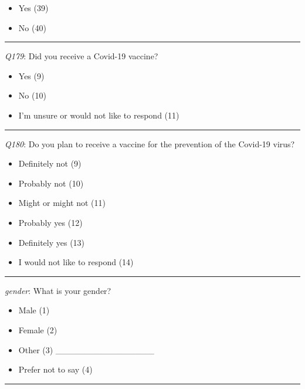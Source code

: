 \begin{singlespace}
\begin{itemize}
\tightlist
\item
  Yes (39)
\item
  No (40)
\end{itemize}

\begin{center}\rule{0.5\linewidth}{0.5pt}\end{center}

\emph{Q179}: Did you receive a Covid-19 vaccine?

\begin{itemize}
\tightlist
\item
  Yes (9)
\item
  No (10)
\item
  I'm unsure or would not like to respond (11)
\end{itemize}

\begin{center}\rule{0.5\linewidth}{0.5pt}\end{center}

\emph{Q180}: Do you plan to receive a vaccine for the prevention of the Covid-19 virus?

\begin{itemize}
\tightlist
\item
  Definitely not (9)
\item
  Probably not (10)
\item
  Might or might not (11)
\item
  Probably yes (12)
\item
  Definitely yes (13)
\item
  I would not like to respond (14)
\end{itemize}

\begin{center}\rule{0.5\linewidth}{0.5pt}\end{center}

\emph{gender}: What is your gender?

\begin{itemize}
\tightlist
\item
  Male (1)
\item
  Female (2)
\item
  Other (3) \_\_\_\_\_\_\_\_\_\_\_\_\_\_\_\_
\item
  Prefer not to say (4)
\end{itemize}

\begin{center}\rule{0.5\linewidth}{0.5pt}\end{center}


\end{singlespace}
